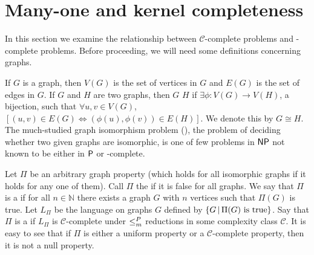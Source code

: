 \section{Many-one and kernel completeness}
\label{sec:npeqcompleteness}

In this section we examine the relationship between $\mathcal{C}$-complete problems and \CEq-complete problems.
Before proceeding, we will need some definitions concerning graphs.

If $G$ is a graph, then $V(G)$ is the set of vertices in $G$ and $E(G)$ is the set of edges in $G$.
If $G$ and $H$ are two graphs, then $G$  $H$ if $\exists\phi\colon V(G)\to V(H)$, a bijection, such that $\forall u,v\in V(G)$, $[(u,v)\in E(G)\iff (\phi(u), \phi(v))\in E(H)]$.
We denote this by $G\cong H$.
The much-studied graph isomorphism problem (\GI), the problem of deciding whether two given graphs are isomorphic, is one of few problems in $\NP$ not known to be either in $\P$ or \NP-complete.

Let $\Pi$ be an arbitrary graph property (which holds for all isomorphic graphs if it holds for any one of them).
Call $\Pi$ the  if it is false for all graphs.
We say that $\Pi$ is a  if for all $n\in\mathbb{N}$ there exists a graph $G$ with $n$ vertices such that $\Pi(G)$ is true.
Let $L_\Pi$ be the language on graphs $G$ defined by $\lb G\st\Pi(G)\textnormal{ is true}\rb$.
Say that $\Pi$ is a  if $L_\Pi$ is $\mathcal{C}$-complete under $\mor$ reductions in some complexity class $\mathcal{C}$.
It is easy to see that if $\Pi$ is either a uniform property or a $\mathcal{C}$-complete property, then it is not a null property.

